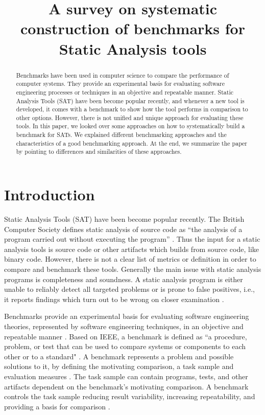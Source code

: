 \documentclass[authoryear,preprint]{sigplanconf}
\begin{document}
	\setlength{\pdfpageheight}{\paperheight}
	\setlength{\pdfpagewidth}{\paperwidth}
	
	\title{A survey on systematic construction of benchmarks for Static Analysis tools}

	\maketitle
\begin{abstract}
	Benchmarks have been used in computer science to compare the performance of computer systems. They provide an experimental basis for evaluating software engineering processes or techniques in an objective and repeatable manner. Static Analysis Tools (SAT) have been become popular recently, and whenever a new tool is developed, it comes with a benchmark to show how the tool performs in comparison to other options. However, there is not unified and unique approach for evaluating these tools. In this paper, we looked over some approaches on how to systematically build a benchmark for SATs. We explained different benchmarking approaches and  the characteristics of a good benchmarking approach. At the end, we summarize the paper by pointing to differences and similarities of these approaches.
\end{abstract}

\section{Introduction}
\label{sec:introduction}
Static Analysis Tools (SAT) have been become popular recently. The British Computer Society defines static analysis of source code as ``the analysis of a program carried out without executing the program'' \cite{Glossary_of_term}. Thus the input for a static analysis tools is source code or other artifacts which builds from source code, like binary code. However, there is not a clear list of metrics or definition in order to compare and benchmark these tools. Generally the main issue with static analysis programs is completeness and soundness. A static analysis program is either unable to reliably detect all targeted problems or is prone to false positives, i.e., it reports findings which turn out to be wrong on closer examination \cite{Scanstud}. 

Benchmarks provide an experimental basis for evaluating software engineering theories, represented by software engineering techniques, in an objective and repeatable manner \cite{675631}. Based on IEEE, a benchmark is defined as ``a procedure, problem, or test that can be used to compare systems or components to each other or to a standard" \cite{IEEE1990}. A benchmark represents a problem and possible solutions to it, by defining the motivating comparison, a task sample and evaluation measures \cite{sim2003}.  The task sample can contain programs, tests, and other artifacts dependent on the benchmark’s motivating comparison. A benchmark controls the task sample reducing result variability, increasing repeatability, and providing a basis for comparison \cite{sim2003}.
\end{document}
